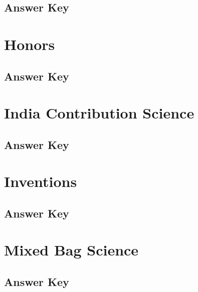 \documentclass[12pt,a4paper]{book}
\begin{document}
\subsection*{Answer Key}



\section{Honors}



\subsection*{Answer Key}



\section{India Contribution Science}



\subsection*{Answer Key}



\section{Inventions}



\subsection*{Answer Key}



\section{Mixed Bag Science}



\subsection*{Answer Key}
\end{document}
